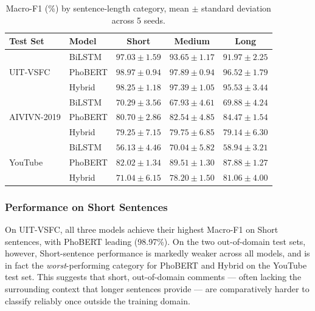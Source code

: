 \documentclass[12pt]{report} %
\begin{document}
\begin{table}[htbp]
    \centering
    \caption{Macro-F1 (\%) by sentence-length category, mean $\pm$ standard deviation across 5 seeds.}
    \label{tab:length-f1}
    \begin{tabular}{llccc}
        \hline
        \textbf{Test Set} & \textbf{Model} & \textbf{Short}            & \textbf{Medium}           & \textbf{Long}             \\
        \hline
        \multirow{3}{*}{UIT-VSFC}
                          & BiLSTM         & $97.03 \pm 1.59$          & $93.65 \pm 1.17$          & $91.97 \pm 2.25$          \\
                          & PhoBERT        & $\mathbf{98.97 \pm 0.94}$ & $\mathbf{97.89 \pm 0.94}$ & $\mathbf{96.52 \pm 1.79}$ \\
                          & Hybrid         & $98.25 \pm 1.18$          & $97.39 \pm 1.05$          & $95.53 \pm 3.44$          \\
        \hline
        \multirow{3}{*}{AIVIVN-2019}
                          & BiLSTM         & $70.29 \pm 3.56$          & $67.93 \pm 4.61$          & $69.88 \pm 4.24$          \\
                          & PhoBERT        & $80.70 \pm 2.86$          & $82.54 \pm 4.85$          & $\mathbf{84.47 \pm 1.54}$ \\
                          & Hybrid         & $79.25 \pm 7.15$          & $79.75 \pm 6.85$          & $79.14 \pm 6.30$          \\
        \hline
        \multirow{3}{*}{YouTube}
                          & BiLSTM         & $56.13 \pm 4.46$          & $70.04 \pm 5.82$          & $58.94 \pm 3.21$          \\
                          & PhoBERT        & $82.02 \pm 1.34$          & $\mathbf{89.51 \pm 1.30}$ & $87.88 \pm 1.27$          \\
                          & Hybrid         & $71.04 \pm 6.15$          & $78.20 \pm 1.50$          & $81.06 \pm 4.00$          \\
        \hline
    \end{tabular}
\end{table}

\subsubsection{Performance on Short Sentences}
On UIT-VSFC, all three models achieve their highest Macro-F1 on Short sentences, with PhoBERT leading (98.97\%). On the two out-of-domain test sets, however, Short-sentence performance is markedly weaker across all models, and is in fact the \textit{worst}-performing category for PhoBERT and Hybrid on the YouTube test set. This suggests that short, out-of-domain comments --- often lacking the surrounding context that longer sentences provide --- are comparatively harder to classify reliably once outside the training domain.
\end{document}

